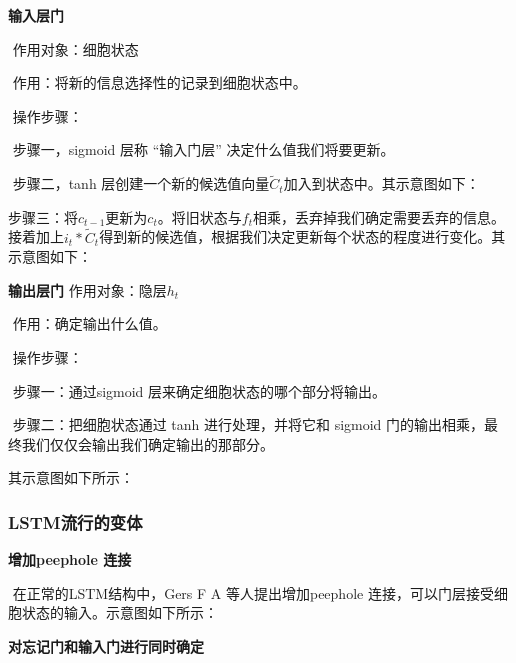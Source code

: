\textbf{输入层门}

​ 作用对象：细胞状态

​ 作用：将新的信息选择性的记录到细胞状态中。

​ 操作步骤：

​ 步骤一，sigmoid 层称 ``输入门层'' 决定什么值我们将要更新。

​ 步骤二，tanh
层创建一个新的候选值向量\(\tilde{C}_t\)加入到状态中。其示意图如下：


​
步骤三：将\(c_{t-1}\)更新为\(c_{t}\)。将旧状态与\(f_t\)相乘，丢弃掉我们确定需要丢弃的信息。接着加上\(i_t * \tilde{C}_t\)得到新的候选值，根据我们决定更新每个状态的程度进行变化。其示意图如下：


\textbf{输出层门} 作用对象：隐层\(h_t\)

​ 作用：确定输出什么值。

​ 操作步骤：

​ 步骤一：通过sigmoid 层来确定细胞状态的哪个部分将输出。

​ 步骤二：把细胞状态通过 tanh 进行处理，并将它和 sigmoid
门的输出相乘，最终我们仅仅会输出我们确定输出的那部分。

其示意图如下所示：


\subsubsection{LSTM流行的变体}\label{lstmux6d41ux884cux7684ux53d8ux4f53}

\textbf{增加peephole 连接}

​ 在正常的LSTM结构中，Gers F A 等人提出增加peephole
连接，可以门层接受细胞状态的输入。示意图如下所示：


\textbf{对忘记门和输入门进行同时确定}

